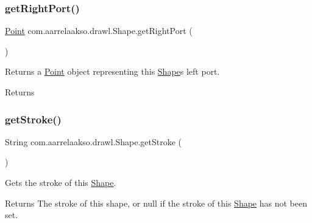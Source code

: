 \subsubsection{\texorpdfstring{get\+Right\+Port()}{getRightPort()}}
{\footnotesize\ttfamily \hyperlink{classcom_1_1aarrelaakso_1_1drawl_1_1_point}{Point} com.\+aarrelaakso.\+drawl.\+Shape.\+get\+Right\+Port (\begin{DoxyParamCaption}{ }\end{DoxyParamCaption})}



Returns a \hyperlink{classcom_1_1aarrelaakso_1_1drawl_1_1_point}{Point} object representing this \hyperlink{classcom_1_1aarrelaakso_1_1drawl_1_1_shape}{Shape}\textquotesingle{}s left port. 

\begin{DoxyReturn}{Returns}

\end{DoxyReturn}
\mbox{\label{classcom_1_1aarrelaakso_1_1drawl_1_1_shape_a4e1d54c7e161e3af5053939ddefdf9e6}} 
\subsubsection{\texorpdfstring{get\+Stroke()}{getStroke()}}
{\footnotesize\ttfamily String com.\+aarrelaakso.\+drawl.\+Shape.\+get\+Stroke (\begin{DoxyParamCaption}{ }\end{DoxyParamCaption})}



Gets the stroke of this \hyperlink{classcom_1_1aarrelaakso_1_1drawl_1_1_shape}{Shape}. 

\begin{DoxyReturn}{Returns}
The stroke of this shape, or null if the stroke of this \hyperlink{classcom_1_1aarrelaakso_1_1drawl_1_1_shape}{Shape} has not been set. 
\end{DoxyReturn}
\mbox{\label{classcom_1_1aarrelaakso_1_1drawl_1_1_shape_aca74cc0c71117040f28329744eebde9d}} 
